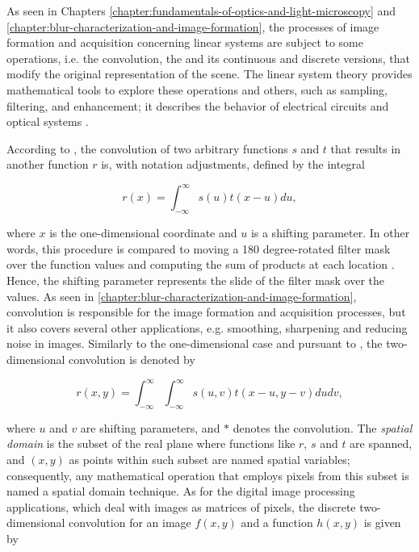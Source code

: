 As seen in Chapters \ref{chapter:fundamentals-of-optics-and-light-microscopy} and \ref{chapter:blur-characterization-and-image-formation}, the processes of image formation and acquisition concerning linear systems are subject to some operations, i.e. the convolution, the  and its continuous and discrete versions, that modify the original representation of the scene. The linear system theory provides mathematical tools to explore these operations and others, such as sampling, filtering, and enhancement; it describes the behavior of electrical circuits and optical systems \cite{castleman1996digital}.

According to , the convolution of two arbitrary functions $s$ and $t$ that results in another function $r$ is, with notation adjustments, defined by the integral

\begin{equation}
\label{eqn:one_dimensional_convolution}
r(x) = \int_{-\infty}^{\infty}s(u) t(x - u) du,
\end{equation}

\noindent where $x$ is the one-dimensional coordinate and $u$ is a shifting parameter. In other words, this procedure is compared to moving a 180 degree-rotated filter mask over the function values and computing the sum of products at each location \cite{gonzalez2018digital}. Hence, the shifting parameter represents the slide of the filter mask over the values. As seen in \autoref{chapter:blur-characterization-and-image-formation}, convolution is responsible for the image formation and acquisition processes, but it also covers several other applications, e.g. smoothing, sharpening and reducing noise in images. Similarly to the one-dimensional case and pursuant to , the two-dimensional convolution is denoted by

\begin{equation}
\label{eqn:two_dimensional_convolution}
r(x,y) = \int_{-\infty}^{\infty}
         \int_{-\infty}^{\infty}
         s(u,v) t(x - u, y - v) du dv,
\end{equation}

\noindent where $u$ and $v$ are shifting parameters, and $\ast$ denotes the convolution. The \emph{spatial domain} is the subset of the real plane where functions like $r$, $s$ and $t$ are spanned, and $(x,y)$ as points within such subset are named spatial variables; consequently, any mathematical operation that employs pixels from this subset is named a spatial domain technique. As for the digital image processing applications, which deal with images as matrices of pixels, the discrete two-dimensional convolution for an image $f(x,y)$ and a function $h(x,y)$ is given by 

